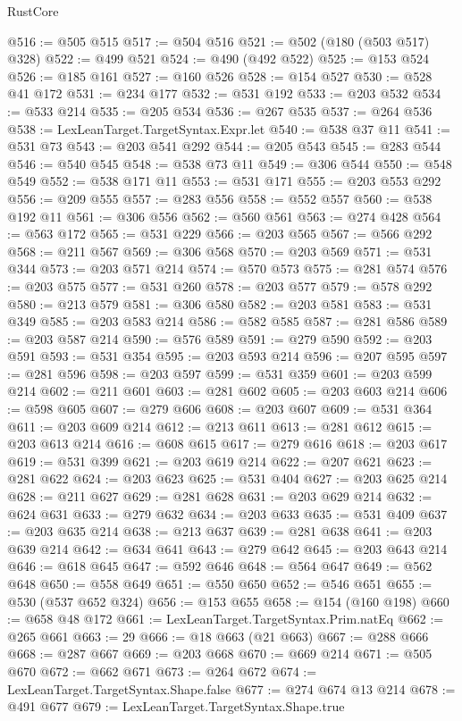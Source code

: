 \begin{lexlean}{RustCore}
\begin{coremodule}
@516 := @505 @515
@517 := @504 @516
@521 := @502 (@180 (@503 @517) @328)
@522 := @499 @521
@524 := @490 (@492 @522)
@525 := @153 @524
@526 := @185 @161
@527 := @160 @526
@528 := @154 @527
@530 := @528 @41 @172
@531 := @234 @177
@532 := @531 @192
@533 := @203 @532
@534 := @533 @214
@535 := @205 @534
@536 := @267 @535
@537 := @264 @536
@538 := LexLeanTarget.TargetSyntax.Expr.let
@540 := @538 @37 @11
@541 := @531 @73
@543 := @203 @541 @292
@544 := @205 @543
@545 := @283 @544
@546 := @540 @545
@548 := @538 @73 @11
@549 := @306 @544
@550 := @548 @549
@552 := @538 @171 @11
@553 := @531 @171
@555 := @203 @553 @292
@556 := @209 @555
@557 := @283 @556
@558 := @552 @557
@560 := @538 @192 @11
@561 := @306 @556
@562 := @560 @561
@563 := @274 @428
@564 := @563 @172
@565 := @531 @229
@566 := @203 @565
@567 := @566 @292
@568 := @211 @567
@569 := @306 @568
@570 := @203 @569
@571 := @531 @344
@573 := @203 @571 @214
@574 := @570 @573
@575 := @281 @574
@576 := @203 @575
@577 := @531 @260
@578 := @203 @577
@579 := @578 @292
@580 := @213 @579
@581 := @306 @580
@582 := @203 @581
@583 := @531 @349
@585 := @203 @583 @214
@586 := @582 @585
@587 := @281 @586
@589 := @203 @587 @214
@590 := @576 @589
@591 := @279 @590
@592 := @203 @591
@593 := @531 @354
@595 := @203 @593 @214
@596 := @207 @595
@597 := @281 @596
@598 := @203 @597
@599 := @531 @359
@601 := @203 @599 @214
@602 := @211 @601
@603 := @281 @602
@605 := @203 @603 @214
@606 := @598 @605
@607 := @279 @606
@608 := @203 @607
@609 := @531 @364
@611 := @203 @609 @214
@612 := @213 @611
@613 := @281 @612
@615 := @203 @613 @214
@616 := @608 @615
@617 := @279 @616
@618 := @203 @617
@619 := @531 @399
@621 := @203 @619 @214
@622 := @207 @621
@623 := @281 @622
@624 := @203 @623
@625 := @531 @404
@627 := @203 @625 @214
@628 := @211 @627
@629 := @281 @628
@631 := @203 @629 @214
@632 := @624 @631
@633 := @279 @632
@634 := @203 @633
@635 := @531 @409
@637 := @203 @635 @214
@638 := @213 @637
@639 := @281 @638
@641 := @203 @639 @214
@642 := @634 @641
@643 := @279 @642
@645 := @203 @643 @214
@646 := @618 @645
@647 := @592 @646
@648 := @564 @647
@649 := @562 @648
@650 := @558 @649
@651 := @550 @650
@652 := @546 @651
@655 := @530 (@537 @652 @324)
@656 := @153 @655
@658 := @154 (@160 @198)
@660 := @658 @48 @172
@661 := LexLeanTarget.TargetSyntax.Prim.natEq
@662 := @265 @661
@663 := 29
@666 := @18 @663 (@21 @663)
@667 := @288 @666
@668 := @287 @667
@669 := @203 @668
@670 := @669 @214
@671 := @505 @670
@672 := @662 @671
@673 := @264 @672
@674 := LexLeanTarget.TargetSyntax.Shape.false
@677 := @274 @674 @13 @214
@678 := @491 @677
@679 := LexLeanTarget.TargetSyntax.Shape.true

\end{coremodule}
\end{lexlean}
